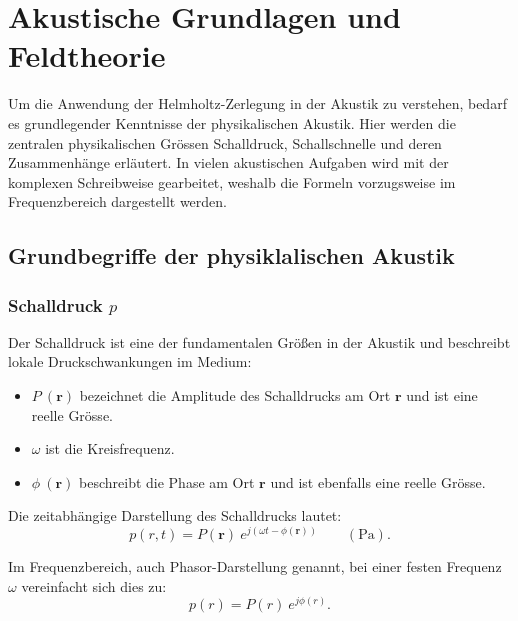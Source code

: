 %
%
%
%
\section{Akustische Grundlagen und Feldtheorie
\label{helmholtz:section:akustische_Grundlagen}}

Um die Anwendung der Helmholtz-Zerlegung in der Akustik zu verstehen, bedarf es grundlegender Kenntnisse der physikalischen Akustik. Hier werden die zentralen physikalischen Grössen Schalldruck, Schallschnelle und deren Zusammenhänge erläutert. In vielen akustischen Aufgaben wird mit der komplexen Schreibweise gearbeitet, weshalb die Formeln vorzugsweise im Frequenzbereich dargestellt werden.

\subsection{Grundbegriffe der physiklalischen Akustik
\label{helmholtz:subsection:Grundbegriffe_Akustik}}

\subsubsection{Schalldruck $p$}
 
\noindent Der Schalldruck ist eine der fundamentalen Größen in der Akustik und beschreibt lokale Druckschwankungen im Medium:
 
\begin{itemize}
\item $P \: (\mathbf{r})$ bezeichnet die Amplitude des Schalldrucks am Ort $\mathbf{r}$ und ist eine reelle Grösse.
\item $\omega$ ist die Kreisfrequenz.
\item $\phi \: (\mathbf{r})$ beschreibt die Phase am Ort $\mathbf{r}$ und ist ebenfalls eine reelle Grösse.
\end{itemize}
 
\noindent Die zeitabhängige Darstellung des Schalldrucks lautet:
\begin{equation}
p(r,t) = P(\mathbf{r}) \: e^{j( \omega t - \phi(\mathbf{r}))} \qquad (\si{\pascal}).
\end{equation}
 
\noindent Im Frequenzbereich, auch Phasor-Darstellung genannt, bei einer festen Frequenz $\omega$ vereinfacht sich dies zu:
\begin{equation}
p(r) = P(r) \: e^{j \phi (r)}.
\label{helmholtz:PhasorSchalldruck}
\end{equation}
 
